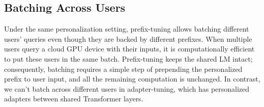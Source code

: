 \documentclass[11pt,a4paper]{article}
\newcommand\pl[1]{\textcolor{red}{[PL: #1]}}
\newcommand\lisa[1]{\textcolor{blue}{[Lisa: #1]}}
\begin{document}

\subsection{Batching Across Users}
Under the same personalization setting, prefix-tuning allows batching different users' queries even though they are backed by different prefixes. 
When multiple users query a cloud GPU device with their inputs, it is computationally efficient to put these users in the same batch. 
Prefix-tuning keeps the shared LM intact; consequently, batching requires a simple step of prepending the personalized prefix to user input, and all the remaining computation is unchanged. 
In contrast, we can't batch across different users in adapter-tuning, which has personalized adapters between shared Transformer layers.   
\end{document}

